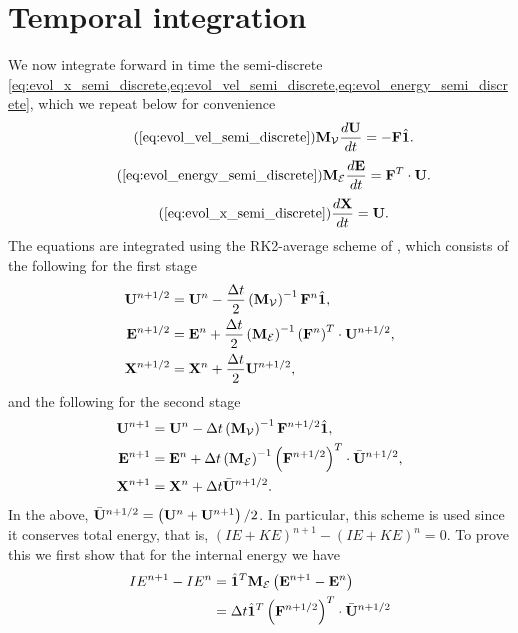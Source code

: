 \documentclass[11pt]{report}
\begin{document}
\section{Temporal integration}
We now integrate forward in time the semi-discrete \cref{eq:evol_x_semi_discrete,eq:evol_vel_semi_discrete,eq:evol_energy_semi_discrete}, which we repeat below for convenience
\begin{equation}
    \tag{\ref{eq:evol_vel_semi_discrete}}
    \Mvec_\mathcal{V} \frac{d\Uvec}{dt} = -\Fvec \hat{\mathbf{1}}.
\end{equation}
\begin{equation}
    \tag{\ref{eq:evol_energy_semi_discrete}}
    \Mvec_\mathcal{E} \frac{d\Evec}{dt} = \Fvec^T \cdot \Uvec.
\end{equation}
\begin{equation}
    \tag{\ref{eq:evol_x_semi_discrete}}
    \frac{d\Xvec}{dt} = \Uvec.
\end{equation}
The equations are integrated using the RK2-average scheme of \cite{dobrev2012}, which consists of the following for the first stage
\begin{align}
    \mathbf{U}^{n+1/2} &= \mathbf{U}^n - \frac{\Delta t}{2} \left( \mathbf{M}_\mathcal{V} \right)^{-1} \mathbf{F}^n \hat{\mathbf{1}}, \nonumber \\
    \mathbf{E}^{n+1/2} &= \mathbf{E}^n + \frac{\Delta t}{2} \left( \mathbf{M}_\mathcal{E} \right)^{-1} \left( \mathbf{F}^n \right)^T \cdot \mathbf{U}^{n+1/2}, \nonumber \\
    \mathbf{X}^{n+1/2} &= \mathbf{X}^n + \frac{\Delta t}{2} \mathbf{U}^{n+1/2},
\end{align}
and the following for the second stage
\begin{align}
    \mathbf{U}^{n+1} &= \mathbf{U}^n - \Delta t \left( \mathbf{M}_\mathcal{V} \right)^{-1} \mathbf{F}^{n+1/2} \hat{\mathbf{1}}, \nonumber \\
    \mathbf{E}^{n+1} &= \mathbf{E}^n + \Delta t \left( \mathbf{M}_\mathcal{E} \right)^{-1} \left( \mathbf{F}^{n+1/2} \right)^T \cdot \bar{\mathbf{U}}^{n+1/2}, \nonumber \\
    \mathbf{X}^{n+1} &= \mathbf{X}^n + \Delta t \bar{\mathbf{U}}^{n+1/2}.
\end{align}
In the above, $\bar{\mathbf{U}}^{n+1/2} = \left( \mathbf{U}^n + \mathbf{U}^{n+1} \right)/2$. In particular, this scheme is used since it conserves total energy, that is, $(IE + KE)^{n+1} - (IE + KE)^n = 0$. To prove this we first show that for the internal energy we have
\begin{align}
    \label{eq:temp_ie_change}
    IE^{n+1} - IE^n &= \hat{\mathbf{1}}^T \mathbf{M}_\mathcal{E} \left( \mathbf{E}^{n+1} - \mathbf{E}^n \right) \nonumber \\
    &= \Delta t \hat{\mathbf{1}}^T \left( \mathbf{F}^{n+1/2} \right)^T \cdot \bar{\mathbf{U}}^{n+1/2}
\end{align}
\end{document}
